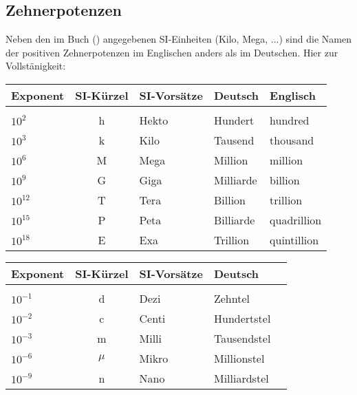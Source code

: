 \subsection{Zehnerpotenzen}


Neben den im Buch () angegebenen SI-Einheiten (Kilo, Mega, ...) sind die
Namen der positiven Zehnerpotenzen im Englischen anders als im
Deutschen. Hier zur Vollstänigkeit:

\begin{tabular}{lclll}
Exponent   & SI-Kürzel & SI-Vorsätze & Deutsch & Englisch\\
\hline\\
$10^{2}$   & h         & Hekto       & Hundert   & hundred\\
$10^{3}$   & k         & Kilo        & Tausend   & thousand\\
$10^{6}$   & M         & Mega        & Million   & million\\
$10^{9}$   & G         & Giga        & Milliarde & billion\\
$10^{12}$  & T         & Tera        & Billion   & trillion\\
$10^{15}$  & P         & Peta        & Billiarde & quadrillion\\
$10^{18}$  & E         & Exa         & Trillion  & quintillion\\
\end{tabular}

\begin{tabular}{lclll}
Exponent   & SI-Kürzel & SI-Vorsätze & Deutsch\\
\hline\\
$10^{-1}$  & d         & Dezi        & Zehntel\\
$10^{-2}$  & c         & Centi       & Hundertstel\\
$10^{-3}$  & m         & Milli       & Tausendstel\\
$10^{-6}$  & $\mu$     & Mikro       & Millionstel\\
$10^{-9}$  & n         & Nano        & Milliardstel\\
\end{tabular}

\newpage


